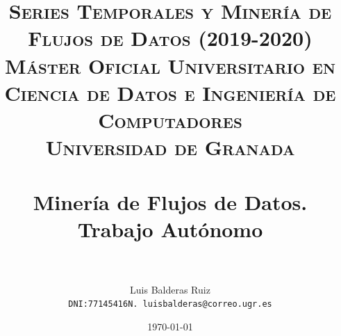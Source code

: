 
\graphicspath{ {./images/} }
\usepackage{subcaption}
\usepackage{hyperref}
\usepackage{soul}



\title{	
\normalfont \normalsize 
\textsc{\textbf{Series Temporales y Minería de Flujos de Datos (2019-2020)} \\ Máster Oficial Universitario en Ciencia de Datos e Ingeniería de Computadores \\ Universidad de Granada} \\ [25pt] %
\horrule{0.5pt} \\[0.4cm] %
\huge Minería de Flujos de Datos. Trabajo Autónomo \\ %
\horrule{2pt} \\[0.5cm] %
}

\author{Luis Balderas Ruiz \\ \texttt{DNI:77145416N. luisbalderas@correo.ugr.es}} 


\date{\normalsize\today} %




\maketitle %

\newpage %

\tableofcontents %

\listoffigures

\listoftables

\newpage

%


